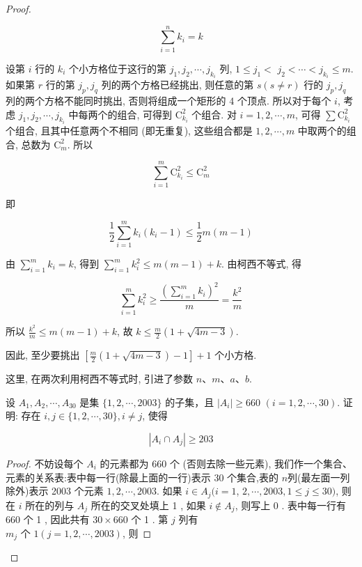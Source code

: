 \begin{proof}
\begin{example}
\begin{solution}
\begin{note}
\begin{solution}
	$$
	\sum_{i=1}^{n} k_{i}=k
	$$
	
	设第 $i$ 行的 $k_{i}$ 个小方格位于这行的第 $j_{1}, j_{2}, \cdots, j_{k_{i}}$ 列, $1 \leqslant j_{1}<$ $j_{2}<\cdots<j_{k_{i}} \leqslant m$. 如果第 $r$ 行的第 $j_{p}, j_{q}$ 列的两个方格已经挑出, 则任意的第 $s(s \neq r)$ 行的 $j_{p}, j_{q}$ 列的两个方格不能同时挑出, 否则将组成一个矩形的 4 个顶点. 所以对于每个 $i$, 考虑 $j_{1}, j_{2}, \cdots, j_{k_{i}}$ 中每两个的组合, 可得到 $\mathrm{C}_{k_{i}}^{2}$ 个组合. 对 $i=1,2, \cdots, m$, 可得 $\sum \mathrm{C}_{k_{i}}^{2}$ 个组合, 且其中任意两个不相同 (即无重复), 这些组合都是 $1,2, \cdots, m$ 中取两个的组合, 总数为 $\mathrm{C}_{m}^{2}$. 所以
	
	$$
	\sum_{i=1}^{m} \mathrm{C}_{k_{i}}^{2} \leqslant \mathrm{C}_{m}^{2}
	$$
	
	即
	
	$$
	\frac{1}{2} \sum_{i=1}^{m} k_{i}\left(k_{i}-1\right) \leqslant \frac{1}{2} m(m-1)
	$$
	
	由 $\sum_{i=1}^{m} k_{i}=k$, 得到 $\sum_{i=1}^{m} k_{i}^{2} \leqslant m(m-1)+k$. 由柯西不等式, 得
	
	$$
	\sum_{i=1}^{m} k_{i}^{2} \geqslant \frac{\left(\sum_{i=1}^{m} k_{i}\right)^{2}}{m}=\frac{k^{2}}{m}
	$$
	
	所以 $\frac{k^{2}}{m} \leqslant m(m-1)+k$, 故 $k \leqslant \frac{m}{2}(1+\sqrt{4 m-3})$.
	
	因此, 至少要挑出 $\left[\frac{m}{2}(1+\sqrt{4 m-3})-1\right]+1$ 个小方格.
\end{solution}
\begin{note}
	这里, 在两次利用柯西不等式时, 引进了参数 $n 、 m 、 a 、 b$.
\end{note}

\begin{example}
	设 $A_{1}, A_{2}, \cdots, A_{30}$ 是集 $\{1,2, \cdots, 2003\}$ 的子集，且 $\left|A_{i}\right| \geqslant 660$ $(i=1,2, \cdots, 30)$. 证明: 存在 $i, j \in\{1,2, \cdots, 30\}, i \neq j$, 使得
	
	$$
	\left|A_{i} \cap A_{j}\right| \geqslant 203
	$$
\end{example}
\begin{proof}
	不妨设每个 $A_{i}$ 的元素都为 660 个 (否则去除一些元素), 我们作一个集合、元素的关系表:表中每一行(除最上面的一行)表示 30 个集合,表的 $n$列(最左面一列除外)表示 2003 个元素 $1,2, \cdots, 2003$. 如果 $i \in A_{j}(i=1$, $2, \cdots, 2003,1 \leqslant j \leqslant 30)$, 则在 $i$ 所在的列与 $A_{j}$ 所在的交叉处填上 1 , 如果 $i \notin A_{j}$, 则写上 0 . 表中每一行有 660 个 1 , 因此共有 $30 \times 660$ 个 1 . 第 $j$ 列有\\
	$m_{j}$ 个 $1(j=1,2, \cdots, 2003)$, 则
	

\end{proof}
\end{note}
\end{solution}
\end{example}
\end{proof}
